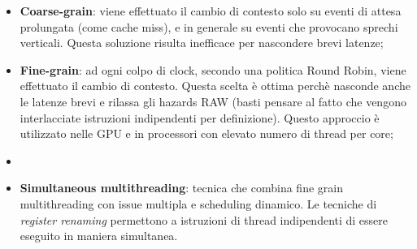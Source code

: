 \begin{itemize}
    \item \textbf{Coarse-grain}: viene effettuato il cambio di contesto solo su eventi di attesa prolungata (come cache miss), e in generale su eventi che provocano sprechi verticali. Questa soluzione risulta inefficace per nascondere brevi latenze;
    \item \textbf{Fine-grain}: ad ogni colpo di clock, secondo una politica Round Robin, viene effettuato il cambio di contesto. Questa scelta è ottima perchè nasconde anche le latenze brevi e rilassa gli hazards RAW (basti pensare al fatto che vengono interlacciate istruzioni indipendenti per definizione). Questo approccio è utilizzato nelle GPU e in processori con elevato numero di thread per core;
    \item \item \textbf{Simultaneous multithreading}: tecnica che combina fine grain multithreading con issue multipla e scheduling dinamico. Le tecniche di \textit{register renaming} permettono a istruzioni di thread indipendenti di essere eseguito in maniera simultanea. 
\end{itemize}

